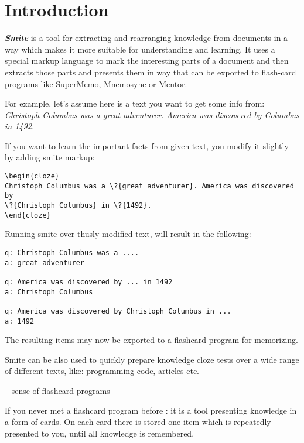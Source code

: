 \documentclass[a4paper,11pt]{article}
\newcommand{\smite}{\emph{\textbf{Smite{}}}}
\begin{document}



%

%

\section{Introduction}

\smite{} is a tool for extracting and rearranging knowledge from documents in
a way which makes it more suitable for understanding and learning. It uses a
special markup language to mark the interesting parts of a document
and then extracts those parts and presents them in way that can be exported
to flash-card programs like SuperMemo, Mnemosyne or Mentor.

For example, let's assume here is a text you want to get some info from:
\textit{Christoph Columbus was a great adventurer. America was discovered by Columbus in 1492.}

If you want to learn the important facts from given text, you modify it slightly by adding smite markup:
\begin{verbatim}
\begin{cloze}
Christoph Columbus was a \?{great adventurer}. America was discovered by
\?{Christoph Columbus} in \?{1492}.
\end{cloze}
\end{verbatim}

Running smite over thusly modified text, will result in the following:
\begin{verbatim}
q: Christoph Columbus was a ....
a: great adventurer

q: America was discovered by ... in 1492
a: Christoph Columbus

q: America was discovered by Christoph Columbus in ...
a: 1492
\end{verbatim}

The resulting items may now be exported to a flashcard program for memorizing.

Smite can be also used to quickly prepare knowledge cloze tests over a wide
range of different texts, like: programming code, articles etc.



-- sense of flashcard programs ---

If you never met a flashcard program before : it is a tool presenting knowledge
in a form of cards. On each card there is stored one item which is repeatedly
presented to you, until all knowledge is remembered.
\end{document}
